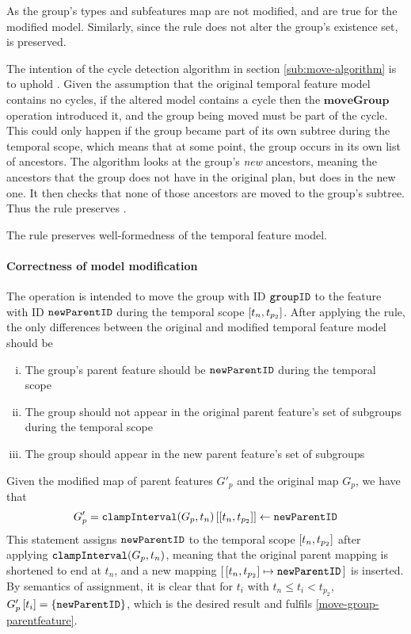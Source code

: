 As the group's types and subfeatures map are not modified,  and  are true for the modified model.  Similarly, since the rule does not alter the group's existence set,  is preserved. 

The intention of the cycle detection algorithm in section \vref{sub:move-algorithm} is to uphold . Given the assumption that the original temporal feature model contains no cycles, if the altered model contains a cycle then the $\textbf{moveGroup}$ operation introduced it, and the group being moved must be part of the cycle. This could only happen if the group became part of its own subtree during the temporal scope, which means that at some point, the group occurs in its own list of ancestors. The algorithm looks at the group's \emph{new} ancestors, meaning the ancestors that the group does not have in the original plan, but does in the new one. It then checks that none of those ancestors are moved to the group's subtree. Thus the rule preserves .
\\

\begin{lemma}
   The  rule preserves well-formedness of the temporal feature model. 
   \label{lemma:move-group-well-formed}
\end{lemma}

\paragraph{Correctness of model modification}
The operation is intended to move the group with ID $\texttt{groupID}$ to the feature with ID $\texttt{newParentID}$ during the temporal scope $\interval{t_n}{t_{p_2}}$. After applying the  rule, the only differences between the original and modified temporal feature model should be
\begin{enumerate}[(i)]
   \item The group's parent feature should be $\texttt{newParentID}$ during the temporal scope \label{move-group-parentfeature}
   \item The group should not appear in the original parent feature's set of subgroups during the temporal scope \label{move-group-oldparent}
   \item The group should appear in the new parent feature's set of subgroups \label{move-group-newparent}
\end{enumerate}

Given the modified map of parent features $G'_p$ and the original map $G_p$, we have that
\[
   G'_p = \lookup{\var{clampInterval}(G_p, t_n)}{\interval{t_n}{t_{p_2}}} \assign \var{newParentID}
\]
This statement assigns $\texttt{newParentID}$ to the temporal scope $\interval{t_n}{t_{p_2}}$ after applying $\texttt{clampInterval}(G_p, t_n)$, meaning that the original parent mapping is shortened to end at $t_n$, and a new mapping $\intervalmapping{t_n}{t_{p_2}}{\var{newParentID}}$ is inserted. By semantics of assignment, it is clear that for $t_i$ with $t_n \leq t_i < t_{p_2}$, $G'_p \left[ t_i \right] = \left\{\texttt{newParentID}\right\}$, which is the desired result and fulfils \ref{move-group-parentfeature}.

